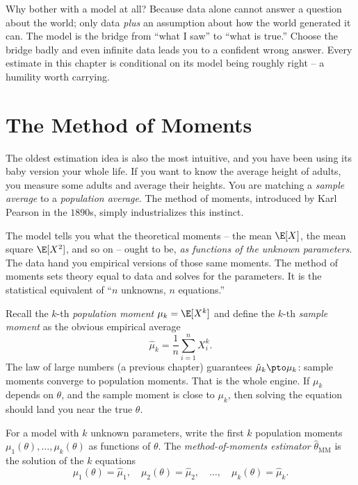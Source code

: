 \begin{aestheticbox}
Why bother with a model at all? Because data alone cannot answer a question
about the world; only data \emph{plus} an assumption about how the world
generated it can. The model is the bridge from ``what I saw'' to ``what is
true.'' Choose the bridge badly and even infinite data leads you to a confident
wrong answer. Every estimate in this chapter is conditional on its model being
roughly right -- a humility worth carrying.
\end{aestheticbox}

\section{The Method of Moments}
\label{ch30:mom}

The oldest estimation idea is also the most intuitive, and you have been using
its baby version your whole life. If you want to know the average height of
adults, you measure some adults and average their heights. You are matching a
\emph{sample average} to a \emph{population average}. The method of moments,
introduced by Karl Pearson in the $1890$s, simply industrializes this instinct.

\begin{intuitionbox}
The model tells you what the theoretical moments -- the mean $\E[X]$, the mean
square $\E[X^2]$, and so on -- ought to be, \emph{as functions of the unknown
parameters}. The data hand you empirical versions of those same moments. The
method of moments sets theory equal to data and solves for the parameters. It
is the statistical equivalent of ``$n$ unknowns, $n$ equations.''
\end{intuitionbox}

Recall the $k$-th \emph{population moment} $\mu_k = \E[X^k]$ and define the
$k$-th \emph{sample moment} as the obvious empirical average
\[
  \hat\mu_k = \frac{1}{n} \sum_{i=1}^n X_i^k.
\]
The law of large numbers (a previous chapter) guarantees
$\hat\mu_k \pto \mu_k$: sample moments converge to population moments. That is
the whole engine. If $\mu_k$ depends on $\theta$, and the sample moment is close
to $\mu_k$, then solving the equation should land you near the true $\theta$.

\begin{definition}
\label{ch30:def-mom}
For a model with $k$ unknown parameters, write the first $k$ population moments
$\mu_1(\theta),\dots,\mu_k(\theta)$ as functions of $\theta$. The
\emph{method-of-moments estimator} $\hat\theta_{\mathrm{MM}}$ is the solution of
the $k$ equations
\[
  \mu_1(\theta) = \hat\mu_1,\quad \mu_2(\theta) = \hat\mu_2,\quad\dots,\quad
  \mu_k(\theta) = \hat\mu_k.
\]
\end{definition}

